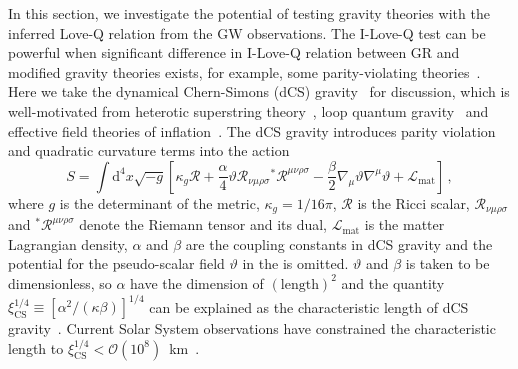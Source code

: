 \documentclass[a4paper,11pt]{article}
\begin{document}
In this section, we investigate the potential of testing gravity theories with the 
inferred Love-Q relation from the GW observations. The I-Love-Q test can be 
powerful when significant difference in I-Love-Q relation between GR and modified 
gravity theories exists, for example, some parity-violating theories~\cite{Yagi_2017,Yunes:2025xwp}. 
Here we take the dynamical Chern-Simons (dCS) gravity~\cite{Jackiw:2003pm,Smith:2007jm,Alexander:2009tp} for discussion, 
which is well-motivated from heterotic superstring theory~\cite{Polchinski:1998rq,
Polchinski:1998rr}, loop quantum gravity~\cite{Alexander:2004xd,Taveras:2008yf,
Calcagni:2009xz} and effective field theories of inflation~\cite{Weinberg:2008hq}. 
The dCS gravity introduces parity violation and quadratic curvature terms into the action~\cite{Alexander:2009tp,Gupta:2017vsl}
\begin{equation}
   \label{cs_action}
   S = \int \mathrm{d}^4 x \sqrt{-g}\left[ \kappa_g \mathcal{R} + \frac{\alpha}{4} \mathcal{\vartheta} \mathcal{R}_{\nu\mu\rho\sigma} {}^{*}\mathcal{R}^{\mu\nu\rho\sigma} - \frac{\beta}{2}\nabla_{\mu}\mathcal{\vartheta}\nabla^{\mu}\mathcal{\vartheta} + \mathcal{L}_{\mathrm{mat}}\right]\,,
\end{equation}
where $g$ is the determinant of the metric, $\kappa_g= 1/16\pi$, $\mathcal{R}$ is 
the Ricci scalar, $\mathcal{R}_{\nu\mu\rho\sigma}$ and
$^{*}\mathcal{R}^{\mu\nu\rho\sigma}$ denote the Riemann tensor and its dual, 
$\mathcal{L}_{\mathrm{mat}}$ is the matter Lagrangian density, 
$\alpha$ and $\beta$ are the coupling constants in dCS gravity and the
potential for the pseudo-scalar field $\mathcal{\vartheta}$ in the is omitted. $\mathcal{\vartheta}$ and $\beta$ is taken to be 
dimensionless, so $\alpha$ have the dimension of $(\mathrm{length})^2$ 
and the quantity $\xi_{\mathrm{CS}}^{1/4} \equiv [\alpha^2/
(\kappa\beta)]^{1/4}$ can be explained as 
the characteristic length of dCS gravity~\cite{Yunes:2009hc,Yagi:2012ya}. 
Current Solar System observations have constrained the characteristic length to 
$\xi_{\mathrm{CS}}^{1/4}<\mathcal{O}(10^8)$~km~\cite{Ali-Haimoud:2011zme,Yagi:2012ya}. 
\end{document}
